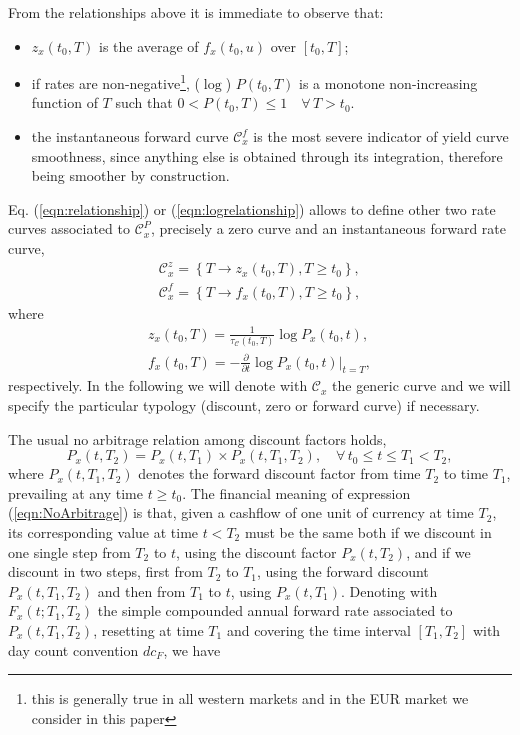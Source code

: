 \documentclass[11pt,reqno]{amsart}
\begin{document}
From the relationships above it is immediate to observe that:
\begin{itemize}
\item $z_x\left(t_0,T\right)$ is the average of $f_x\left(t_0,u\right)$ over $\left[t_0,T\right]$;
\item if rates are non-negative\footnote{this is generally true in all western markets and in the EUR market we consider in this paper}, ($\log $) $P(t_0,T)$ is a monotone non-increasing function of $T$ such that $0<P\left(t_0,T\right)\leq 1\quad\forall\,T>t_0$.
\item the instantaneous forward curve $\mathcal{C}_x^f$ is the most severe indicator of yield curve smoothness, since anything else is obtained through its integration, therefore being smoother by construction.
\end{itemize}
\par
Eq. (\ref{eqn:relationship}) or (\ref{eqn:logrelationship}) allows to define other two rate curves associated to $\mathcal{C}_x^P$, precisely a zero curve and an instantaneous forward rate curve,
\begin{gather}
\mathcal{C}_x^z=\left\{ T\longrightarrow z_{x}\left( t_{0},T\right) ,T\geq t_{0}\right\},
\label{eqn:ZeroCurve}\\
\mathcal{C}_x^f=\left\{ T\longrightarrow f_{x}\left( t_{0},T\right) ,T\geq t_{0}\right\},
\label{eqn:InstFwdCurve}
\end{gather}
where
\begin{gather}
z_x\left(t_0,T\right)
    = \frac{1}{\tau_{\mathcal{C}}\left(t_0,T\right)}\log P_x(t_0,t),\\
f_x\left(t_0,T\right)
    = -\frac{\partial}{\partial t}\log P_x(t_0,t)|_{t=T},
\end{gather}
respectively. In the following we will denote with $\mathcal{C}_x$ the generic curve and we will specify the particular typology (discount, zero or forward curve) if necessary.
\par
The usual no arbitrage relation among discount factors holds,
\begin{equation}
P_x\left(t,T_2\right)
= P_x\left(t,T_1\right) \times P_x\left(t,T_1,T_2\right),
\quad\forall\, t_0 \leq t \leq T_1<T_2,
\label{eqn:NoArbitrage}
\end{equation}
where $P_x\left(t,T_1,T_2\right) $ denotes the forward discount factor from time $T_2$ to time $T_1$, prevailing at any time $t\geq t_0$. The financial meaning of expression (\ref{eqn:NoArbitrage}) is that, given a cashflow of one unit of currency at time $T_2$, its corresponding value at time $t<T_2$ must be the same both if we discount in one single step from $T_2$ to $t$, using the discount factor $P_x\left(t,T_2\right)$, and if we discount in two steps, first from $T_2$ to $T_1$, using the forward discount $P_x\left(t,T_1,T_2\right)$ and then from $T_1$ to $t$, using $P_x\left(t,T_1\right)$. Denoting with $F_x\left(t;T_1,T_2\right)$ the simple compounded annual forward rate associated to $P_x\left(t,T_1,T_2\right)$, resetting at time $T_1$ and covering the time interval $\left[T_1,T_2\right]$ with day count convention $dc_F$, we have
\end{document}
